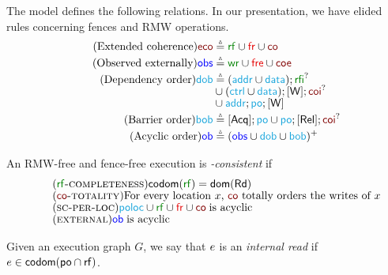 The \armeight{} model defines the following relations.
In our presentation, we have elided rules concerning fences and RMW operations.
\begin{align*}
  \tag{Extended coherence}
  {\reco} &\eqdef {\rrf} \cup {\rfr} \cup {\rco}
  \\
  \tag{Observed externally}
  {\robs} &\eqdef \smash{
    {\rrfe} \cup {\rfre} \cup {\rcoe}
  }
  \\
  \tag{Dependency order}
  {\rdob} &\eqdef \smash{({\raddr}\cup{\rdata}); {\rrfi}^?}
  \\[-1ex]
  &\cup \smash{({\rctrl}\cup{\rdata}); {\IDW}; {\rcoi}^?}
  \\[-1ex]
  &\cup \smash{{\raddr}; {\rpox}; {\IDW}}
  \\
  \tag{Barrier order}
  {\rbob} &\eqdef\smash{
    {\IDAcq}; {\rpox}
    \cup {\rpox};{\IDRel}; {\rcoi}^?
  }
  \\
  \tag{Acyclic order}
  {\rob} &\eqdef\smash{
    ({\robs} \cup {\rdob} \cup {\rbob})^+
  }
\end{align*}
\begin{definition}
  An RMW-free and fence-free execution is \emph{\armeight{}-consistent} if
  \begin{align*}&
    \tag{\textsc{$\rrfx$-completeness}}\label{rf-comp}
    \fcodom(\rrfx)=\fdom(\rreads)
    \\[-1ex]&
    \tag{\textsc{$\rco$-totality}}\label{co-tot}
    \text{For every location $\aLoc$, $\rco$ totally orders the writes of $\aLoc$}  
    \\[-1ex]&
    \tag{\textsc{sc-per-loc}}\label{sc-per-loc}
    {\rpoloc} \cup {\rrfx} \cup {\rfr} \cup {\rco}\;\text{is acyclic}
    \\[-1ex]&
    \tag{\textsc{external}}\label{external}
    {\rob}\;\text{is acyclic}
  \end{align*}
\end{definition}



Given an execution graph $G$, we say that $e$ is an \emph{internal read} if
$e\in\mathsf{codom}(\mathsf{po}\cap \mathsf{rf})$.    


